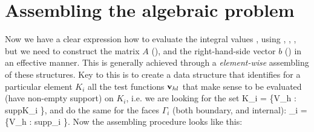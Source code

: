 \section{Assembling the algebraic problem}
Now we have a clear expression how to evaluate the integral values ,  using , , , but we need to construct the matrix $A$ (), and the right-hand-side vector $b$ () in an effective manner.
This is generally achieved through a \textit{element-wise} assembling of these structures. Key to this is to create a data structure that identifies for a particular element $K_i$ all the test functions $\mathrm{\mathbf{v}}_{hl}$ that make sense to be evaluated (have non-empty support) on $K_i$, i.e. we are looking for the set
\be
\mrvh \lo K_i \ro = \left\{\mrvh \in V_h : supp\lo\mrvh\ro \cap K_i \neq \emptyset \right\},
\ee
and do the same for the faces $\Gamma_i$ (both boundary, and internal):
\be
\mrvh \lo \Gamma_i \ro = \left\{\mrvh \in V_h : supp\lo\mrvh\ro \cap \Gamma_i \neq \emptyset \right\}.
\ee
Now the assembling procedure looks like this:\\
